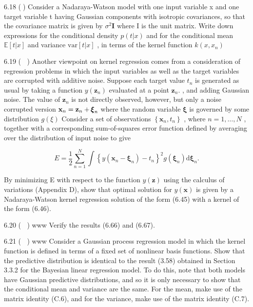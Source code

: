\documentclass[
  10
]{article}
\begin{document}
6.18 () Consider a Nadaraya-Watson model with one input variable x and
one target variable t having Gaussian components with isotropic
covariances, so that the covariance matrix is given by
\(\sigma ^ { 2 } \mathbf { I }\) where I is the unit matrix. Write down
expressions for the conditional density \(p ( t | x )\) and for the
conditional mean \(\mathbb { E } [ t | x ]\) and variance
\(\mathrm { v a r } [ t | x ]\) , in terms of the kernel function
\(k ( x , x _ { n } )\)

6.19 ( ) Another viewpoint on kernel regression comes from a
consideration of regression problems in which the input variables as
well as the target variables are corrupted with additive noise. Suppose
each target value \(t _ { n }\) is generated as usual by taking a
function \(y ( \mathbf { z } _ { n } )\) evaluated at a point
\(\mathbf { z } _ { n } .\) , and adding Gaussian noise. The value of
\(\mathbf { z } _ { n }\) is not directly observed, however, but only a
noise corrupted version
\({ \bf x } _ { n } = { \bf z } _ { n } + { \pmb { \xi } } _ { n }\)
where the random variable \(\boldsymbol { \xi }\) is governed by some
distribution \(g ( \xi )\) Consider a set of observations
\(\left\{ \mathbf { x } _ { n } , t _ { n } \right\}\) , where
\(n = 1 , \ldots , N\) , together with a corresponding sum-of-squares
error function defined by averaging over the distribution of input noise
to give

\[
E = \frac {1}{2} \sum_ {n = 1} ^ {N} \int \left\{y (\mathbf {x} _ {n} - \pmb {\xi} _ {n}) - t _ {n} \right\} ^ {2} g (\pmb {\xi} _ {n}) \mathrm{d} \pmb {\xi} _ {n}.\tag{6.99}
\]

By minimizing E with respect to the function \(y ( \mathbf { z } )\)
using the calculus of variations (Appendix D), show that optimal
solution for \(y ( \mathbf x )\) is given by a Nadaraya-Watson kernel
regression solution of the form (6.45) with a kernel of the form (6.46).

6.20 ( ) www Verify the results (6.66) and (6.67).

6.21 ( ) www Consider a Gaussian process regression model in which the
kernel function is defined in terms of a fixed set of nonlinear basis
functions. Show that the predictive distribution is identical to the
result (3.58) obtained in Section 3.3.2 for the Bayesian linear
regression model. To do this, note that both models have Gaussian
predictive distributions, and so it is only necessary to show that the
conditional mean and variance are the same. For the mean, make use of
the matrix identity (C.6), and for the variance, make use of the matrix
identity (C.7).
\end{document}
